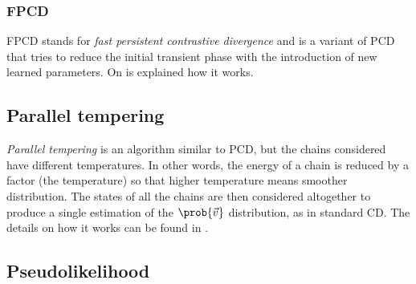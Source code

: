   \subsubsection{FPCD}
  FPCD stands for \emph{fast persistent contrastive divergence} and is a variant of PCD that tries
  to reduce the initial transient phase with the introduction of new learned parameters.
  On \cite{fischer2012introduction} is explained how  it works.
  
  \subsection{Parallel tempering}
  \emph{Parallel tempering} is an algorithm similar to PCD, but the chains
  considered have different temperatures. In other words, the energy of a
  chain is reduced by a factor (the temperature) so that higher temperature
  means smoother distribution. The states of all the chains are then considered altogether to
  produce a single estimation of the \(\prob{\vec{v}}\) distribution, as in standard CD.
  The details on how it works can be found in \cite{fischer2012introduction}.
  
  \subsection{Pseudolikelihood}
  